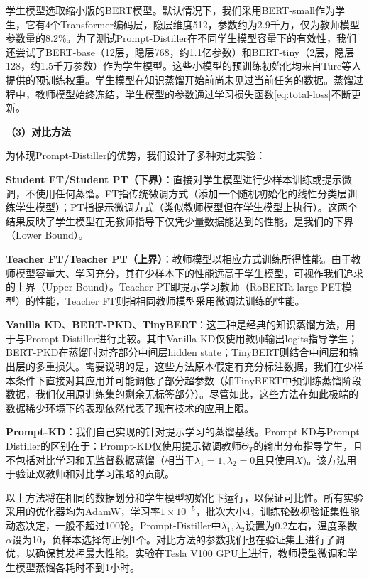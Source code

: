 \documentclass[../main.tex]{subfiles}
\begin{document}
学生模型选取缩小版的BERT模型。默认情况下，我们采用BERT-small作为学生，它有4个Transformer编码层，隐层维度512，参数约为2.9千万，仅为教师模型参数量的8.2\%。为了测试Prompt-Distiller在不同学生模型容量下的有效性，我们还尝试了BERT-base（12层，隐层768，约1.1亿参数）和BERT-tiny（2层，隐层128，约1.5千万参数）作为学生模型。这些小模型的预训练初始化均来自Turc等人提供的预训练权重。学生模型在知识蒸馏开始前尚未见过当前任务的数据。蒸馏过程中，教师模型始终冻结，学生模型的参数通过学习损失函数\eqref{eq:total-loss}不断更新。

\vspace{1em}
\textbf{（3）对比方法}
\vspace{0.5em}

为体现Prompt-Distiller的优势，我们设计了多种对比实验：

\textbf{Student FT/Student PT（下界）}：直接对学生模型进行少样本训练或提示微调，不使用任何蒸馏。FT指传统微调方式（添加一个随机初始化的线性分类层训练学生模型）；PT指提示微调方式（类似教师模型但在学生模型上执行）。这两个结果反映了学生模型在无教师指导下仅凭少量数据能达到的性能，是我们的下界（Lower Bound）。

\textbf{Teacher FT/Teacher PT（上界）}：教师模型以相应方式训练所得性能。由于教师模型容量大、学习充分，其在少样本下的性能远高于学生模型，可视作我们追求的上界（Upper Bound）。Teacher PT即提示学习教师（RoBERTa-large PET模型）的性能，Teacher FT则指相同教师模型采用微调法训练的性能。

\textbf{Vanilla KD}、\textbf{BERT-PKD}、\textbf{TinyBERT}：这三种是经典的知识蒸馏方法，用于与Prompt-Distiller进行比较。其中Vanilla KD仅使用教师输出logits指导学生；BERT-PKD在蒸馏时对齐部分中间层hidden state；TinyBERT则结合中间层和输出层的多重损失。需要说明的是，这些方法原本假定有充分标注数据，我们在少样本条件下直接对其应用并可能调低了部分超参数（如TinyBERT中预训练蒸馏阶段数据，我们仅用原训练集的剩余无标签部分）。尽管如此，这些方法在如此极端的数据稀少环境下的表现依然代表了现有技术的应用上限。

\textbf{Prompt-KD}：我们自己实现的针对提示学习的蒸馏基线。Prompt-KD与Prompt-Distiller的区别在于：Prompt-KD仅使用提示微调教师$\Theta_T$的输出分布指导学生，且不包括对比学习和无监督数据蒸馏（相当于$\lambda_1=1,\lambda_2=0$且只使用$X$)。该方法用于验证双教师和对比学习策略的贡献。

以上方法将在相同的数据划分和学生模型初始化下运行，以保证可比性。所有实验采用的优化器均为AdamW，学习率$1\times 10^{-5}$，批次大小4，训练轮数视验证集性能动态决定，一般不超过100轮。Prompt-Distiller中$\lambda_1,\lambda_2$设置为0.2左右，温度系数$\alpha$设为10，负样本选择每正例1个。对比方法的参数我们也在验证集上进行了调优，以确保其发挥最大性能。实验在Tesla V100 GPU上进行，教师模型微调和学生模型蒸馏各耗时不到1小时。
\end{document}

